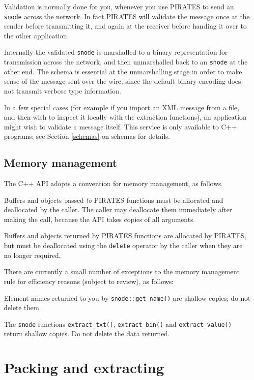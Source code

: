 \documentclass[12pt,a4paper,twoside]{article}
\renewcommand{\_}{\texttt{\symbol{95}}}
\begin{document}
Validation is normally done for you, whenever you use PIRATES to send an
\verb^snode^ across the network. In fact PIRATES will validate the
message once at the sender before transmitting it, and again at the
receiver before handing it over to the other application.

Internally the validated \verb^snode^ is marshalled to a binary
representation for transmission across the network, and then
unmarshalled back to an \verb^snode^ at the other end.
The schema is essential at the unmarshalling stage in order to
make sense of the message sent over the wire, since the default
binary encoding does not transmit verbose type information.

In a few special cases (for example if you import an XML message
from a file, and then wish to inspect it locally with the extraction
functions), an application might wish to validate a message itself.
This service is only available to C++ programs; see Section \ref{schemas}
on schemas for details.

\subsection{Memory management}

The C++ API adopts a convention for memory management, as follows.

Buffers and objects passed \textit{to} PIRATES functions must be allocated and
deallocated by the caller. The caller may deallocate them immediately
after making the call, because the API takes copies of all arguments.

Buffers and objects returned by PIRATES functions are
allocated by PIRATES, but must be deallocated using the \verb^delete^
operator by the caller when they are no longer required.

There are currently a small number of exceptions to the memory
management rule for efficiency reasons (subject to review), as follows:

\begin{bulletlist}
\item Element names returned to you by \verb^snode::get_name()^
      are shallow copies; do not delete them.
\item The \verb^snode^ functions \verb^extract_txt()^, \verb^extract_bin()^
      and \verb^extract_value()^ return shallow copies. Do not delete
		the data returned.
\end{bulletlist}

\section{Packing and extracting}
\end{document}

